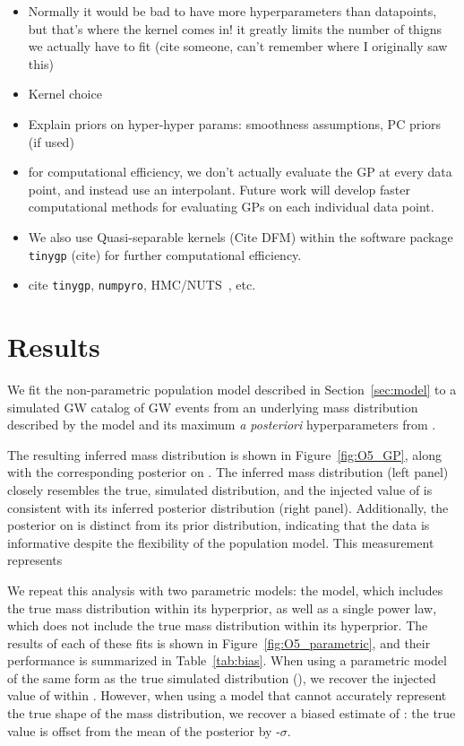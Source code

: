 \documentclass[]{aastex631}
\begin{document}
\begin{itemize}
    \item Normally it would be bad to have more hyperparameters than datapoints, but that's where the kernel comes in! it greatly limits the number of thigns we actually have to fit (cite someone, can't remember where I originally saw this)
    \item Kernel choice   
    \item Explain priors on hyper-hyper params: smoothness assumptions, PC priors~\citep{simpson_penalising_2017} (if used)
    \item for computational efficiency, we don't actually evaluate the GP at every data point, and instead use an interpolant. Future work will develop faster computational methods for evaluating GPs on each individual data point.
    \item We also use Quasi-separable kernels (Cite DFM) within the software package \texttt{tinygp} (cite) for further computational efficiency. 
    \item cite \texttt{tinygp}, \texttt{numpyro}, HMC/NUTS~\citep{hoffman_no-u-turn_2011}, etc.
\end{itemize}
\section{Results}
\label{sec:results}
We fit the non-parametric population model described in Section~\ref{sec:model} to a simulated GW catalog of  GW events from an underlying mass distribution described by the \plp{} model and its maximum \emph{a posteriori} hyperparameters from \citet{o3b_pop}.

The resulting inferred mass distribution is shown in Figure~\ref{fig:O5_GP}, along with the corresponding posterior on \Ho.
The inferred mass distribution (left panel) closely resembles the true, simulated distribution, and the injected value of \Ho is consistent with its inferred posterior distribution (right panel).
Additionally, the posterior on \Ho is distinct from its prior distribution, indicating that the data is informative despite the flexibility of the population model.
This measurement represents 

We repeat this analysis with two parametric models: the \plp{} model, which includes the true mass distribution within its hyperprior, as well as a single power law, which does not include the true mass distribution within its hyperprior.
The results of each of these fits is shown in Figure~\ref{fig:O5_parametric}, and their performance is summarized in Table~\ref{tab:bias}.
When using a parametric model of the same form as the true simulated distribution (\plp), we recover the injected value of \Ho{} within .
However, when using a model that cannot accurately represent the true shape of the mass distribution, we recover a biased estimate of \Ho: the true value is offset from the mean of the posterior by -$\sigma$.
\end{document}
